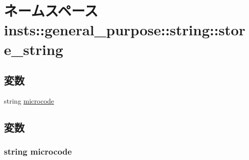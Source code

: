 \hypertarget{namespaceinsts_1_1general__purpose_1_1string_1_1store__string}{
\section{ネームスペース insts::general\_\-purpose::string::store\_\-string}
\label{namespaceinsts_1_1general__purpose_1_1string_1_1store__string}
}
\subsection*{変数}
\begin{DoxyCompactItemize}
\item 
string \hyperlink{namespaceinsts_1_1general__purpose_1_1string_1_1store__string_a770f11a173e99389a8802f0107ed8f52}{microcode}
\end{DoxyCompactItemize}


\subsection{変数}
\hypertarget{namespaceinsts_1_1general__purpose_1_1string_1_1store__string_a770f11a173e99389a8802f0107ed8f52}{
\subsubsection[{microcode}]{\setlength{\rightskip}{0pt plus 5cm}string {\bf microcode}}}
\label{namespaceinsts_1_1general__purpose_1_1string_1_1store__string_a770f11a173e99389a8802f0107ed8f52}
